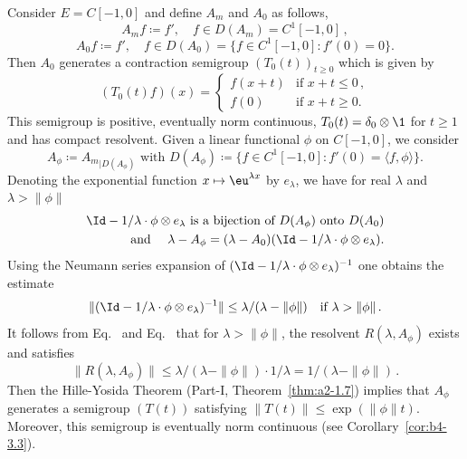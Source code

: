 \begin{example}
\begin{enumerate}[\upshape (i), wide, labelindent=.25em]
	Consider $E = C[-1,0]$ and define $A_{m}$ and $A_{0}$ as follows,
	\begin{equation}\label{eq:b3-2.23}
		A_{m}f \coloneqq f', \quad f \in D(A_{m}) = C^{1}[-1,0]\,,
	\end{equation}
	\begin{equation}\label{eq:b3-2.24}
		A_{0}f \coloneqq f', \quad f \in D(A_{0}) = \{f \in C^{1}[-1,0] \colon f'(0) = 0\}.
	\end{equation}
	Then $A_{0}$ generates a contraction semigroup $(T_{0}(t))_{t \geq 0}$ which is given by
	\begin{equation}\label{eq:b3-2.25}
		(T_{0}(t)f)(x) = \begin{cases}
			f(x+t) & \text{if } x+t \leq 0\,, \\
			f(0) & \text{if } x+t \geq 0.
		\end{cases}
	\end{equation}
	This semigroup is positive, eventually norm continuous, $T_{0}(t) = \delta_{0}\otimes \1$ for $t \geq 1$ and has compact resolvent.
	Given a linear functional $\phi$ on $C[-1,0]$, we consider
	\begin{equation}\label{eq:b3-2.26}
		A_{\phi} \coloneqq {A_{m}}_{|D(A_{\phi})} \text{ with } D(A_{\phi}) \coloneqq \{f \in C^{1}[-1,0] \colon f'(0) = \langle f,\phi \rangle\}.
	\end{equation}
	Denoting the exponential function $x \mapsto \eu^{\lambda x}$ by $e_{\lambda}$, we have for real $\lambda$ and $\lambda > \|\phi\|$
	 \begin{equation}\label{eq:b3-2.27}
	 \begin{aligned}
		\Id  - 1/\lambda \cdot \phi \otimes e_{\lambda} \text{ is a bijection of } D(A_{\phi}) \text{ onto } D(A_{0})   \\
		\text{ and }\quad \lambda - A_{\phi} = (\lambda - A_{0})(\Id  - 1/\lambda \cdot \phi \otimes e_{\lambda}).
	\end{aligned}
	\end{equation}
	Using the Neumann series expansion of\/ $(\Id  - 1/\lambda \cdot \phi \otimes e_{\lambda})^{-1}$ one obtains the estimate
	\begin{equation}\label{eq:b3-2.28}
		\|(\Id  - 1/\lambda \cdot \phi \otimes e_{\lambda})^{-1}\| \leq \lambda/(\lambda - \|\phi\|) \quad \text{if } \lambda > \|\phi\|\,.
	\end{equation}
It follows from Eq.~ and Eq.~ that for $\lambda > \|\phi\|$, the resolvent $R(\lambda,A_{\phi})$ exists and satisfies 
\[
\|R(\lambda,A_{\phi})\| \leq \lambda/(\lambda-\|\phi\|)\cdot 1/\lambda = 1/(\lambda-\|\phi\|)\,.
\]
Then the Hille-Yosida Theorem (Part-I, Theorem~\ref{thm:a2-1.7}) implies that $A_{\phi}$ generates a semigroup $(T(t))$ satisfying $\|T(t)\| \leq \exp(\|\phi\|t)$.
Moreover, this semigroup is eventually norm continuous (see Corollary~\ref{cor:b4-3.3}).


\end{enumerate}
\end{example}
